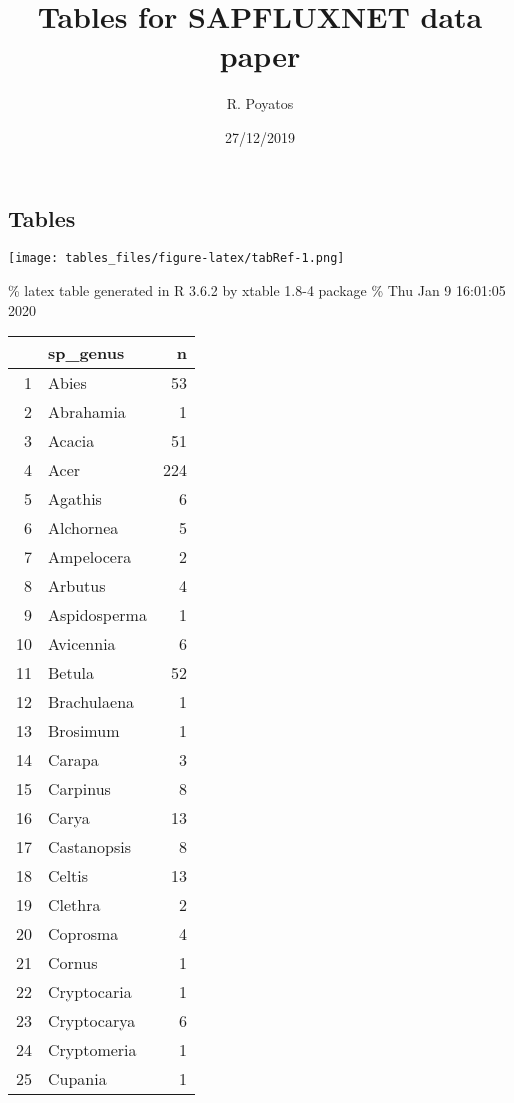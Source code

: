 \documentclass[]{article}
\title{Tables for SAPFLUXNET data paper}
\author{R. Poyatos}
\date{27/12/2019}
\begin{document}
\maketitle

\hypertarget{tables}{%
\subsection{Tables}\label{tables}}

\texttt{[image: tables\_files/figure-latex/tabRef-1.png]}
\pagebreak

\% latex table generated in R 3.6.2 by xtable 1.8-4 package \% Thu Jan 9
16:01:05 2020

\begin{table}[ht]
\centering
\begin{tabular}{rlr}
  \hline
 & sp\_genus & n \\ 
  \hline
1 & Abies &  53 \\ 
  2 & Abrahamia &   1 \\ 
  3 & Acacia &  51 \\ 
  4 & Acer & 224 \\ 
  5 & Agathis &   6 \\ 
  6 & Alchornea &   5 \\ 
  7 & Ampelocera &   2 \\ 
  8 & Arbutus &   4 \\ 
  9 & Aspidosperma &   1 \\ 
  10 & Avicennia &   6 \\ 
  11 & Betula &  52 \\ 
  12 & Brachulaena &   1 \\ 
  13 & Brosimum &   1 \\ 
  14 & Carapa &   3 \\ 
  15 & Carpinus &   8 \\ 
  16 & Carya &  13 \\ 
  17 & Castanopsis &   8 \\ 
  18 & Celtis &  13 \\ 
  19 & Clethra &   2 \\ 
  20 & Coprosma &   4 \\ 
  21 & Cornus &   1 \\ 
  22 & Cryptocaria &   1 \\ 
  23 & Cryptocarya &   6 \\ 
  24 & Cryptomeria &   1 \\ 
  25 & Cupania &   1 \\ 

\end{tabular}
\end{table}
\end{document}
